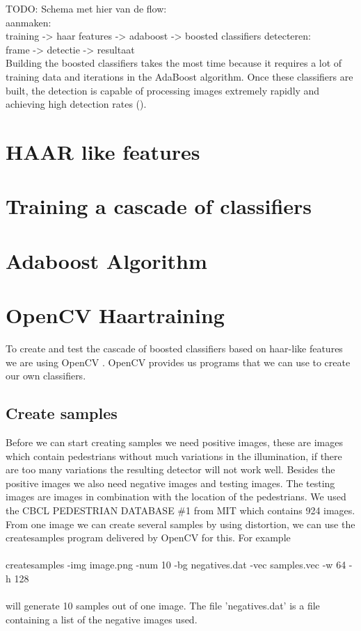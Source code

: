 \documentclass{article}
\begin{document}
TODO: Schema met hier van de flow:\\
aanmaken:\\
training -> haar features -> adaboost -> boosted classifiers
detecteren:\\
frame -> detectie -> resultaat\\

Building the boosted classifiers takes the most time because it requires a lot of training data and iterations in the AdaBoost algorithm. Once these classifiers are built, the detection is capable of processing images
extremely rapidly and achieving high detection rates (\cite{viola2001rapid}).

\section{HAAR like features}


\section{Training a cascade of classifiers}

\section{Adaboost Algorithm}


\section{OpenCV Haartraining}
To create and test the cascade of boosted classifiers based on haar-like features we are using OpenCV \cite{opencv_library}. OpenCV provides us programs that we can use to create our own classifiers.

\subsection{Create samples}
Before we can start creating samples we need positive images, these are images which contain pedestrians without much variations in the illumination, if there are too many variations the resulting detector will not work well.
Besides the positive images we also need negative images and testing images. The testing images are images in combination with the location of the pedestrians. We used the CBCL PEDESTRIAN DATABASE \#1 from MIT which contains 924 images.
From one image we can create several samples by using distortion, we can use the createsamples program delivered by OpenCV for this. For example 
\\\\
createsamples -img image.png -num 10 -bg negatives.dat -vec samples.vec -w 64 -h 128
\\\\
will generate 10 samples out of one image.
The file 'negatives.dat' is a file containing a list of the negative images used.
\end{document}
